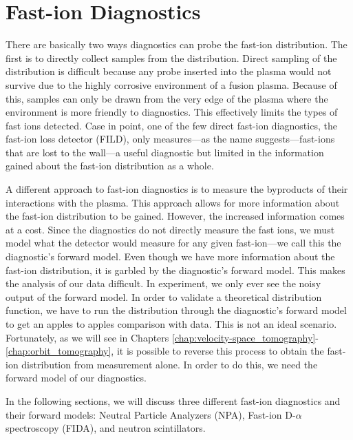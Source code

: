 \chapter{Fast-ion Diagnostics}\label{chap:diagnostics}
There are basically two ways diagnostics can probe the fast-ion distribution. The first is to directly collect samples from the distribution. Direct sampling of the distribution is difficult because any probe inserted into the plasma would not survive due to the highly corrosive environment of a fusion plasma. Because of this, samples can only be drawn from the very edge of the plasma where the environment is more friendly to diagnostics. This effectively limits the types of fast ions detected. Case in point, one of the few direct fast-ion diagnostics, the fast-ion loss detector (FILD), only measures---as the name suggests---fast-ions that are lost to the wall---a useful diagnostic but limited in the information gained about the fast-ion distribution as a whole.

A different approach to fast-ion diagnostics is to measure the byproducts of their interactions with the plasma. This approach allows for more information about the fast-ion distribution to be gained. However, the increased information comes at a cost. Since the diagnostics do not directly measure the fast ions, we must model what the detector would measure for any given fast-ion---we call this the diagnostic's forward model. Even though we have more information about the fast-ion distribution, it is garbled by the diagnostic's forward model. This makes the analysis of our data difficult. In experiment, we only ever see the noisy output of the forward model. In order to validate a theoretical distribution function, we have to run the distribution through the diagnostic's forward model to get an apples to apples comparison with data. This is not an ideal scenario. Fortunately, as we will see in Chapters \ref{chap:velocity-space_tomography}-\ref{chap:orbit_tomography}, it is possible to reverse this process to obtain the fast-ion distribution from measurement alone. In order to do this, we need the forward model of our diagnostics.

In the following sections, we will discuss three different fast-ion diagnostics and their forward models: Neutral Particle Analyzers (NPA), Fast-ion D-$\alpha$ spectroscopy (FIDA), and neutron scintillators.

